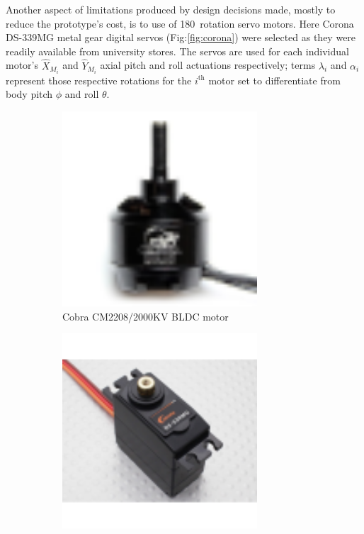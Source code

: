 \par
Another aspect of limitations produced by design decisions made, mostly to reduce the prototype's cost, is to use of 180\textdegree ~rotation servo motors. Here Corona DS-339MG metal gear digital servos (Fig:\ref{fig:corona}) were selected as they were readily available from university stores. The servos are used for each individual motor's $\hat{X}_{M_i}$ and $\hat{Y}_{M_i}$ axial pitch and roll actuations respectively; terms $\lambda_i$ and $\alpha_i$ represent those respective rotations for the $i^{\text{th}}$ motor set to differentiate from body pitch $\phi$ and roll $\theta$.
\par
\begin{figure}[hbtp]
\vspace{-4pt}
\begin{subfigure}{0.5\textwidth}
\centering
\includegraphics[width=0.8\textwidth]{figs/cobra-motor}
\vspace{-6pt}
\caption{Cobra CM2208/2000KV BLDC motor~\cite{cobraimage}}
\label{fig:cobra}
\end{subfigure}
\begin{subfigure}{0.5\textwidth}
\centering
\includegraphics[width=0.8\textwidth]{figs/corona-servo}

\end{subfigure}
\end{figure}
